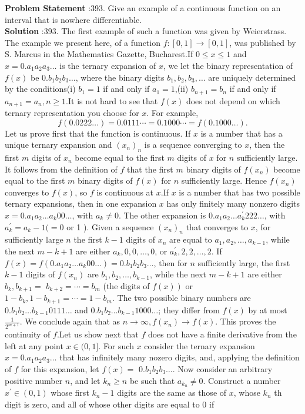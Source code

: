 \documentclass[10pt]{article}
\begin{document}
\textbf{Problem Statement} :393. Give an example of a continuous function on an interval that is nowhere differentiable.\\
\textbf{Solution} :393. The first example of such a function was given by Weierstrass. The example we present here, of a function $f:[0,1] \rightarrow[0,1]$, was published by S. Marcus in the Mathematics Gazette, Bucharest.If $0 \leq x \leq 1$ and $x=0 . a_{1} a_{2} a_{3} \ldots$ is the ternary expansion of $x$, we let the binary representation of $f(x)$ be $0 . b_{1} b_{2} b_{3} \ldots$, where the binary digits $b_{1}, b_{2}, b_{3}, \ldots$ are uniquely determined by the conditions(i) $b_{1}=1$ if and only if $a_{1}=1$,(ii) $b_{n+1}=b_{n}$ if and only if $a_{n+1}=a_{n}, n \geq 1$.It is not hard to see that $f(x)$ does not depend on which ternary representation you choose for $x$. For example,$$ f(0.0222 \ldots)=0.0111 \cdots=0.1000 \cdots=f(0.1000 \ldots) . $$Let us prove first that the function is continuous. If $x$ is a number that has a unique ternary expansion and $\left(x_{n}\right)_{n}$ is a sequence converging to $x$, then the first $m$ digits of $x_{n}$ become equal to the first $m$ digits of $x$ for $n$ sufficiently large. It follows from the definition of $f$ that the first $m$ binary digits of $f\left(x_{n}\right)$ become equal to the first $m$ binary digits of $f(x)$ for $n$ sufficiently large. Hence $f\left(x_{n}\right)$ converges to $f(x)$, so $f$ is continuous at $x$.If $x$ is a number that has two possible ternary expansions, then in one expansion $x$ has only finitely many nonzero digits $x=0 . a_{1} a_{2} \ldots a_{k} 00 \ldots$, with $a_{k} \neq 0$. The other expansion is $0 . a_{1} a_{2} \ldots a_{k}^{\prime} 222 \ldots$, with $a_{k}^{\prime}=a_{k}-1(=0$ or 1 ). Given a sequence $\left(x_{n}\right)_{n}$ that converges to $x$, for sufficiently large $n$ the first $k-1$ digits of $x_{n}$ are equal to $a_{1}, a_{2}, \ldots, a_{k-1}$, while the next $m-k+1$ are either $a_{k}, 0,0, \ldots, 0$, or $a_{k}^{\prime}, 2,2, \ldots, 2$. If $f(x)=f\left(0 . a_{1} a_{2} \ldots a_{k} 00 \ldots\right)=0 . b_{1} b_{2} b_{3} \ldots$, then for $n$ sufficiently large, the first $k-1$ digits of $f\left(x_{n}\right)$ are $b_{1}, b_{2}, \ldots, b_{k-1}$, while the next $m-k+1$ are either $b_{k}, b_{k+1}=$ $b_{k+2}=\cdots=b_{m}$ (the digits of $\left.f(x)\right)$ or $1-b_{k}, 1-b_{k+1}=\cdots=1-b_{m}$. The two possible binary numbers are $0 . b_{1} b_{2} \ldots b_{k-1} 0111 \ldots$ and $0 . b_{1} b_{2} \ldots b_{k-1} 1000 \ldots$; they differ from $f(x)$ by at most $\frac{1}{2^{m+1}}$. We conclude again that as $n \rightarrow \infty, f\left(x_{n}\right) \rightarrow f(x)$. This proves the continuity of $f$.Let us show next that $f$ does not have a finite derivative from the left at any point $x \in(0,1]$. For such $x$ consider the ternary expansion $x=0 . a_{1} a_{2} a_{3} \ldots$ that has infinitely many nozero digits, and, applying the definition of $f$ for this expansion, let $f(x)=$ $0 . b_{1} b_{2} b_{3} \ldots$. Now consider an arbitrary positive number $n$, and let $k_{n} \geq n$ be such that $a_{k_{n}} \neq 0$. Construct a number $x^{\prime} \in(0,1)$ whose first $k_{n}-1$ digits are the same as those of $x$, whose $k_{n}$ th digit is zero, and all of whose other digits are equal to 0 if 
\end{document}
